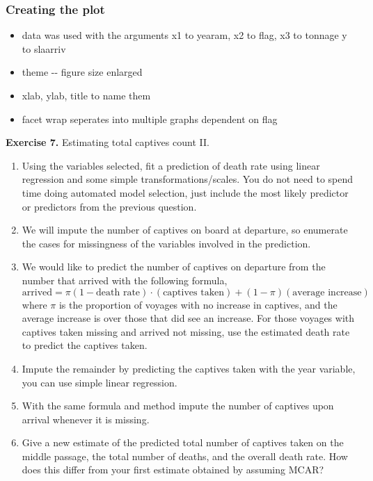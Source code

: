 \documentclass[11pt]{article}
\providecommand{\tightlist}{%
      \setlength{\itemsep}{0pt}\setlength{\parskip}{0pt}}
\begin{document}
\subsubsection{Creating the plot}\label{creating-the-plot-2}

\begin{itemize}
\tightlist
\item
  data was used with the arguments x1 to yearam, x2 to flag, x3 to
  tonnage y to slaarriv
\item
  theme -\/- figure size enlarged
\item
  xlab, ylab, title to name them
\item
  facet wrap seperates into multiple graphs dependent on flag
\end{itemize}

    \textbf{Exercise 7.} Estimating total captives count II.

\begin{enumerate}
\def\labelenumi{\arabic{enumi}.}
\tightlist
\item
  Using the variables selected, fit a prediction of death rate using
  linear regression and some simple transformations/scales. You do not
  need to spend time doing automated model selection, just include the
  most likely predictor or predictors from the previous question.
\item
  We will impute the number of captives on board at departure, so
  enumerate the cases for missingness of the variables involved in the
  prediction.
\item
  We would like to predict the number of captives on departure from the
  number that arrived with the following formula, \[
  \textrm{arrived} = \pi (1 - \textrm{death rate}) \cdot (\textrm{captives taken}) + (1- \pi) (\textrm{average increase})
  \] where \(\pi\) is the proportion of voyages with no increase in
  captives, and the average increase is over those that did see an
  increase. For those voyages with captives taken missing and arrived
  not missing, use the estimated death rate to predict the captives
  taken.
\item
  Impute the remainder by predicting the captives taken with the year
  variable, you can use simple linear regression.
\item
  With the same formula and method impute the number of captives upon
  arrival whenever it is missing.
\item
  Give a new estimate of the predicted total number of captives taken on
  the middle passage, the total number of deaths, and the overall death
  rate. How does this differ from your first estimate obtained by
  assuming MCAR?
\end{enumerate}
\end{document}
